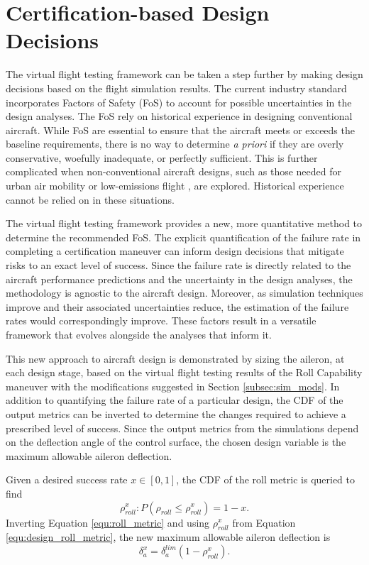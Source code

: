 \section{Certification-based Design Decisions}

The virtual flight testing framework can be taken a step further by making design decisions based on the flight simulation results. 
The current industry standard incorporates Factors of Safety (FoS) to account for possible uncertainties in the design analyses.
The FoS rely on historical experience in designing conventional aircraft. 
While FoS are essential to ensure that the aircraft meets or exceeds the baseline requirements, there is no way to determine \textit{a priori} if they are overly conservative, woefully inadequate, or perfectly sufficient. 
This is further complicated when non-conventional aircraft designs, such as those needed for urban air mobility \cite{silva_vtol_2018} or low-emissions flight \cite{bruner_nasa_2010}, are explored.
Historical experience cannot be relied on in these situations. 

The virtual flight testing framework provides a new, more quantitative method to determine the recommended FoS.
The explicit quantification of the failure rate in completing a certification maneuver can inform design decisions that mitigate risks to an exact level of success.
Since the failure rate is directly related to the aircraft performance predictions and the uncertainty in the design analyses, the methodology is agnostic to the aircraft design. 
Moreover, as simulation techniques improve and their associated uncertainties reduce, the estimation of the failure rates would correspondingly improve. 
These factors result in a versatile framework that evolves alongside the analyses that inform it. 

This new approach to aircraft design is demonstrated by sizing the aileron, at each design stage, based on the virtual flight testing results of the Roll Capability maneuver with the modifications suggested in Section \ref{subsec:sim_mods}.
In addition to quantifying the failure rate of a particular design, the CDF of the output metrics can be inverted to determine the changes required to achieve a prescribed level of success. 
Since the output metrics from the simulations depend on the deflection angle of the control surface, the chosen design variable is the maximum allowable aileron deflection.

Given a desired success rate $x\in[0,1]$, the CDF of the roll metric is queried to find 
\begin{equation} \label{equ:design_roll_metric}
    \rho_{roll}^x:P(\rho_{roll} \leq \rho_{roll}^x) = 1-x.
\end{equation}
Inverting Equation \ref{equ:roll_metric} and using $\rho_{roll}^x$ from Equation \ref{equ:design_roll_metric}, the new maximum allowable aileron deflection is
\begin{equation} \label{equ:design_ail_lim}
    \delta_a^{x} = \delta_a^{lim} \left ( 1 - \rho_{roll}^x \right ).
\end{equation}

